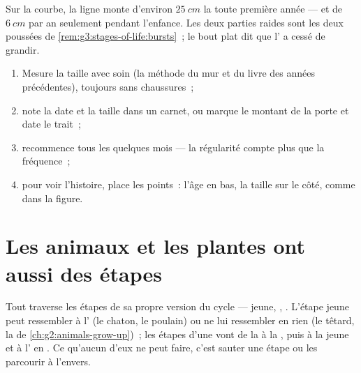 \begin{example}\label{ex:g3:stages-of-life:reading}
Sur la courbe, la ligne monte d'environ $\qty{25}{cm}$ la toute
première année --- et de $\qty{6}{cm}$ par an seulement pendant
l'enfance. Les deux parties raides sont les deux poussées de
\cref{rem:g3:stages-of-life:bursts}~; le bout plat dit que l'
a cessé de grandir.
\end{example}

\begin{method}\label{met:g3:stages-of-life:keep}
\begin{enumerate}
  \item Mesure la taille avec soin (la méthode du mur et du livre
        des années précédentes), toujours sans chaussures~;
  \item note la date et la taille dans un carnet, ou marque le
        montant de la porte et date le trait~;
  \item recommence tous les quelques mois --- la régularité compte
        plus que la fréquence~;
  \item pour voir l'histoire, place les points~: l'âge en bas, la
        taille sur le côté, comme dans la figure.
\end{enumerate}
\end{method}

\section{Les animaux et les plantes ont aussi des étapes}

\begin{proposition}\label{prop:g3:stages-of-life:animals}
Tout  traverse les étapes de sa propre version du cycle
--- jeune, , . L'étape jeune peut ressembler à
l' (le chaton, le poulain) ou ne lui ressembler en rien (le
têtard, la  de \cref{ch:g2:animals-grow-up})~; les étapes
d'une  vont de la  à la , puis à la jeune
 et à l' en . Ce qu'aucun d'eux ne peut faire,
c'est sauter une étape ou les parcourir à l'envers.
\end{proposition}
\admitted

